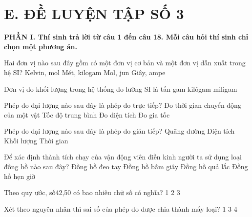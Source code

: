 \section*{E. ĐỀ LUYỆN TẬP SỐ 3}

\noindent\textbf{\large PHẦN I. Thí sinh trả lời từ câu 1 đến câu 18. Mỗi câu hỏi thí sinh chỉ chọn một phương án.}\par\vspace{0.2cm}
\begin{ex} Hai đơn vị nào sau đây gồm có một đơn vị cơ bản và một đơn vị dẫn xuất trong
hệ SI?
\choice
{Kelvin, mol}
{Mét, kilogam}
{\True Mol, jun}
{Giây, ampe}
\loigiai{}
\end{ex}

\begin{ex} Đơn vị đo khối lượng trong hệ thống đo lường SI là
\choice
{tấn}
{gam}
{\True kilôgam}
{miligam}
\loigiai{}
\end{ex}

\begin{ex} Phép đo đại lượng nào sau đây là phép đo trực tiếp?
\choice
{\True Đo thời gian chuyển động của một vật}
{Tốc độ trung bình}
{Đo diện tích}
{Đo gia tốc}
\loigiai{}
\end{ex}

\begin{ex} Phép đo đại lượng nào sau đây là phép đo gián tiếp?
\choice
{Quãng đường}
{\True Diện tích}
{Khối lượng}
{Thời gian}
\loigiai{}
\end{ex}

\begin{ex} Để xác định thành tích chạy của vận động viên điền kinh người ta sử dụng
loại đồng hồ nào sau đây?
\choice
{Đồng hồ đeo tay}
{\True Đồng hồ bấm giây}
{Đồng hồ quả lắc}
{Đồng hồ hẹn giờ}
\loigiai{}
\end{ex}

\begin{ex} Theo quy ước, số42,50 có bao nhiêu chữ số có nghĩa?
\choice
{1}
{2}
{}
{3}
\end{ex}

\begin{ex} Xét theo nguyên nhân thì sai số của phép đo được chia thành mấy loại?
\choice
{1}
{3}
{}
{4}
\loigiai{}
\end{ex}


